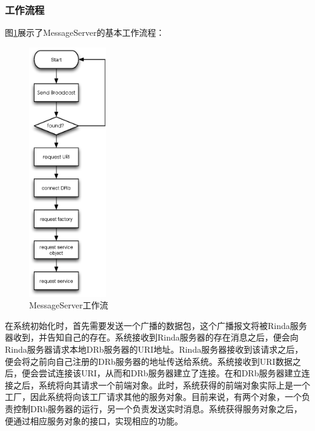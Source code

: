 \subsubsection{工作流程}
图\ref{fig-msg-process}展示了MessageServer的基本工作流程：
\begin{figure}[h]
\centering
\includegraphics[width=0.3\textwidth]{images/detail/message_server_process.eps}
\caption{MessageServer工作流}
\label{fig-msg-process}
\end{figure}

在系统初始化时，首先需要发送一个广播的数据包，这个广播报文将被Rinda服务器收到，并告知自己的存在。系统接收到Rinda服务器的存在消息之后，便会向Rinda服务器请求本地DRb服务器的URI地址。Rinda服务器接收到该请求之后，便会将之前向自己注册的DRb服务器的地址传送给系统。系统接收到URI数据之后，便会尝试连接该URI，从而和DRb服务器建立了连接。在和DRb服务器建立连接之后，系统将向其请求一个前端对象。此时，系统获得的前端对象实际上是一个工厂，因此系统将向该工厂请求其他的服务对象。目前来说，有两个对象，一个负责控制DRb服务器的运行，另一个负责发送实时消息。系统获得服务对象之后，便通过相应服务对象的接口，实现相应的功能。


